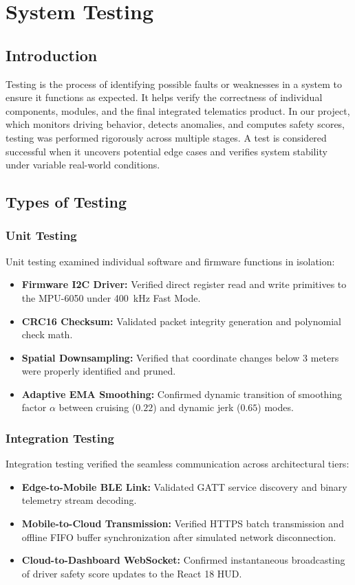 \chapter{System Testing}
\label{chap:testing}

\section{Introduction}
\label{sec:test_intro}
Testing is the process of identifying possible faults or weaknesses in a system to ensure it functions as expected. It helps verify the correctness of individual components, modules, and the final integrated telematics product. In our project, which monitors driving behavior, detects anomalies, and computes safety scores, testing was performed rigorously across multiple stages. A test is considered successful when it uncovers potential edge cases and verifies system stability under variable real-world conditions.

\section{Types of Testing}
\label{sec:test_types}

\subsection{Unit Testing}
Unit testing examined individual software and firmware functions in isolation:
\begin{itemize}
    \item \textbf{Firmware I2C Driver:} Verified direct register read and write primitives to the MPU-6050 under 400~kHz Fast Mode.
    \item \textbf{CRC16 Checksum:} Validated packet integrity generation and polynomial check math.
    \item \textbf{Spatial Downsampling:} Verified that coordinate changes below 3 meters were properly identified and pruned.
    \item \textbf{Adaptive EMA Smoothing:} Confirmed dynamic transition of smoothing factor $\alpha$ between cruising ($0.22$) and dynamic jerk ($0.65$) modes.
\end{itemize}

\subsection{Integration Testing}
Integration testing verified the seamless communication across architectural tiers:
\begin{itemize}
    \item \textbf{Edge-to-Mobile BLE Link:} Validated GATT service discovery and binary telemetry stream decoding.
    \item \textbf{Mobile-to-Cloud Transmission:} Verified HTTPS batch transmission and offline FIFO buffer synchronization after simulated network disconnection.
    \item \textbf{Cloud-to-Dashboard WebSocket:} Confirmed instantaneous broadcasting of driver safety score updates to the React 18 HUD.
\end{itemize}

